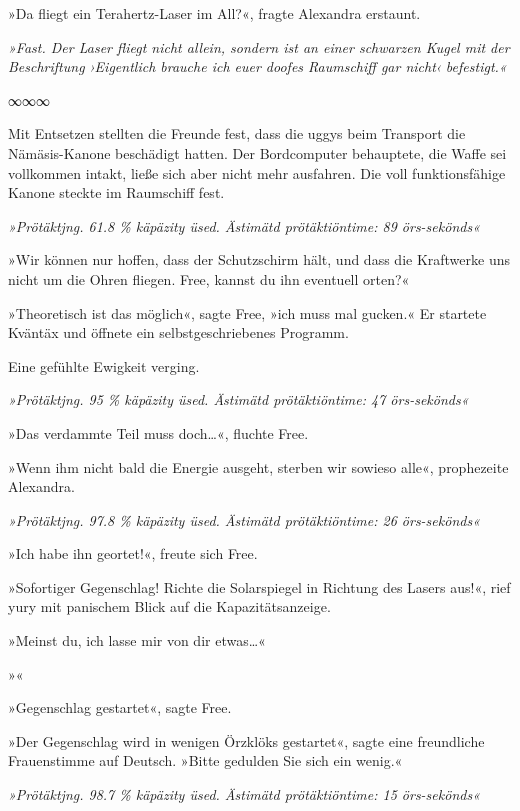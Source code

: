 »Da fliegt ein Terahertz-Laser im All?«, fragte Alexandra erstaunt.

\textit{»Fast. Der Laser fliegt nicht allein, sondern ist an einer schwarzen Kugel mit der Beschriftung ›Eigentlich brauche ich euer doofes Raumschiff gar nicht‹ befestigt.«}

\begin{center}
    ∞∞∞
\end{center}

Mit Entsetzen stellten die Freunde fest, dass die uggys beim Transport die Nämäsis-Kanone beschädigt hatten. Der Bordcomputer behauptete, die Waffe sei vollkommen intakt, ließe sich aber nicht mehr ausfahren. Die voll funktionsfähige Kanone steckte im Raumschiff fest.

\textit{»Prötäktjng. 61.8 \% käpäzity üsed. Ästimätd prötäktiöntime: 89 örs-sekönds«}

»Wir können nur hoffen, dass der Schutzschirm hält, und dass die Kraftwerke uns nicht um die Ohren fliegen. Free, kannst du ihn eventuell orten?«

»Theoretisch ist das möglich«, sagte Free, »ich muss mal gucken.« Er startete Kväntäx und öffnete ein selbstgeschriebenes Programm.

Eine gefühlte Ewigkeit verging.

\textit{»Prötäktjng. 95 \% käpäzity üsed. Ästimätd prötäktiöntime: 47 örs-sekönds«}

»Das verdammte Teil muss doch…«, fluchte Free.

»Wenn ihm nicht bald die Energie ausgeht, sterben wir sowieso alle«, prophezeite Alexandra.

\textit{»Prötäktjng. 97.8 \% käpäzity üsed. Ästimätd prötäktiöntime: 26 örs-sekönds«}

»Ich habe ihn geortet!«, freute sich Free.

»Sofortiger Gegenschlag! Richte die Solarspiegel in Richtung des Lasers aus!«, rief yury mit panischem Blick auf die Kapazitätsanzeige.

»Meinst du, ich lasse mir von dir etwas…«

»«

»Gegenschlag gestartet«, sagte Free.

»Der Gegenschlag wird in wenigen Örzklöks gestartet«, sagte eine freundliche Frauenstimme auf Deutsch. »Bitte gedulden Sie sich ein wenig.«

\textit{»Prötäktjng. 98.7 \% käpäzity üsed. Ästimätd prötäktiöntime: 15 örs-sekönds«}

